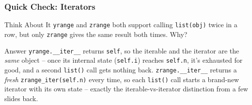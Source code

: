 \begin{frame}[fragile]\frametitle{Quick Check: Iterators}
\begin{block}{Think About It}
\lstinline|yrange| and \lstinline|zrange| both support calling \lstinline|list(obj)| twice in a
row, but only \lstinline|zrange| gives the same result both times. Why?
\end{block}
\pause
\begin{block}{Answer}
\lstinline|yrange.__iter__| returns \lstinline|self|, so the iterable and the iterator are the
\emph{same} object -- once its internal state (\lstinline|self.i|) reaches \lstinline|self.n|,
it's exhausted for good, and a second \lstinline|list()| call gets nothing back.
\lstinline|zrange.__iter__| returns a \emph{fresh} \lstinline|zrange_iter(self.n)| every time,
so each \lstinline|list()| call starts a brand-new iterator with its own state -- exactly the
iterable-vs-iterator distinction from a few slides back.
\end{block}
\end{frame}





